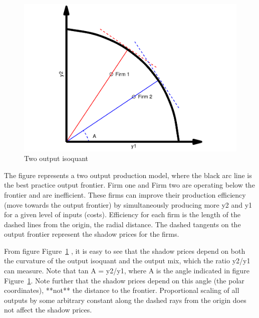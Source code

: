 \documentclass[
  letterpaper,
  DIV=11,
  numbers=noendperiod]{scrartcl}
\begin{document}
\begin{figure}[H]

{\centering \includegraphics{EE_R-R_files/figure-pdf/fig-iso-1.pdf}

}

\caption{\label{fig-iso}Two output isoquant}

\end{figure}

\begin{footnotesize}

The figure represents a two output production model, where the black arc line is the best practice output frontier. Firm one and Firm two are operating below the frontier and are inefficient. These firms can improve their production efficiency (move towards the output frontier) by simultaneously producing more y2 and y1 for a given level of inputs (costs). Efficiency for each firm is the length of the dashed lines from the origin, the radial distance. The dashed tangents on the output frontier represent the shadow prices for the firms.

\end{footnotesize}

From figure Figure~\ref{fig-iso} , it is easy to see that the shadow
prices depend on both the curvature of the output isoquant and the
output mix, which the ratio y2/y1 can measure. Note that tan A = y2/y1,
where A is the angle indicated in figure Figure~\ref{fig-iso}. Note
further that the shadow prices depend on this angle (the polar
coordinates), **not** the distance to the frontier. Proportional scaling
of all outputs by some arbitrary constant along the dashed rays from the
origin does not affect the shadow prices.
\end{document}
